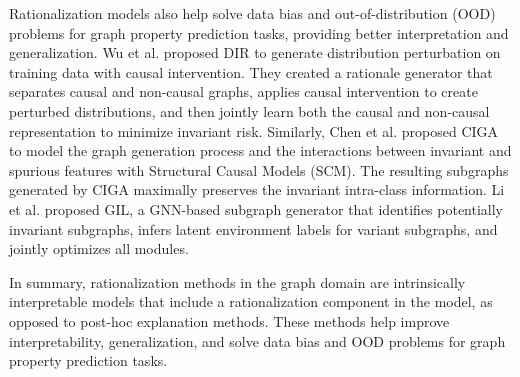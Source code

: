 \documentclass[acmsmall,natbib=false]{acmart}
\begin{document}
Rationalization models also help solve data bias and out-of-distribution (OOD) problems for graph property prediction tasks, providing better interpretation and generalization. Wu et al. \cite{111} proposed DIR to generate distribution perturbation on training data with causal intervention. They created a rationale generator that separates causal and non-causal graphs, applies causal intervention to create perturbed distributions, and then jointly learn both the causal and non-causal representation to minimize invariant risk. Similarly, Chen et al. \cite{12} proposed CIGA to model the graph generation process and the interactions between invariant and spurious features with Structural Causal Models (SCM). The resulting subgraphs generated by CIGA maximally preserves the invariant intra-class information. Li et al. \cite{62} proposed GIL, a GNN-based subgraph generator that identifies potentially invariant subgraphs, infers latent environment labels for variant subgraphs, and jointly optimizes all modules. 

In summary, rationalization methods in the graph domain are intrinsically interpretable models that include a rationalization component in the model, as opposed to post-hoc explanation methods. These methods help improve interpretability, generalization, and solve data bias and OOD problems for graph property prediction tasks.

\printbibliography

\appendix




\end{document}
